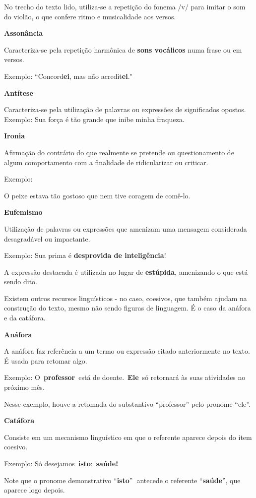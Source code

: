 \begin{itemize}
\begin{itemize}
{\begin{itemize}
\begin{itemize}
{No trecho do texto lido, utiliza-se a repetição do fonema /v/ para
imitar o som do violão, o que confere ritmo e musicalidade aos versos.

\textbf{Assonância}

Caracteriza-se pela repetição harmônica de \textbf{sons vocálicos} numa
frase ou em versos.

Exemplo: ``Concord\textbf{ei}, mas não acredit\textbf{ei}."

\textbf{Antítese}

Caracteriza-se pela utilização de palavras ou expressões de significados
opostos. Exemplo: Sua força é tão grande que inibe minha fraqueza.

\textbf{Ironia}

Afirmação do contrário do que realmente se pretende ou questionamento de
algum comportamento com a finalidade de ridicularizar ou criticar.

Exemplo:

O peixe estava tão gostoso que nem tive coragem de comê-lo.

\textbf{Eufemismo}

Utilização de palavras ou expressões que amenizam uma mensagem
considerada desagradável ou impactante.

Exemplo: Sua prima é \textbf{desprovida de inteligência}!

A expressão destacada é utilizada no lugar de \textbf{estúpida},
amenizando o que está sendo dito.

Existem outros recursos linguísticos - no caso, coesivos, que também
ajudam na construção do texto, mesmo não sendo figuras de linguagem. É o
caso da anáfora e da catáfora.

\textbf{Anáfora}

A anáfora faz referência a um termo ou expressão citado anteriormente no
texto. É usada para retomar algo.

Exemplo: O~\textbf{professor}~está de doente.~\textbf{Ele}~só retornará
às suas atividades no próximo mês.

Nesse exemplo, houve a retomada do substantivo ``professor'' pelo
pronome ``ele''.

\textbf{Catáfora}

Consiste em um mecanismo linguístico em que o referente aparece depois
do item coesivo.

Exemplo: Só desejamos~\textbf{isto}:~\textbf{saúde!}

Note que o pronome demonstrativo ``\textbf{isto}''\textbf{~}antecede o
referente ``\textbf{saúde}'', que aparece logo depois.
}


\end{itemize}
\end{itemize}}
\end{itemize}
\end{itemize}
